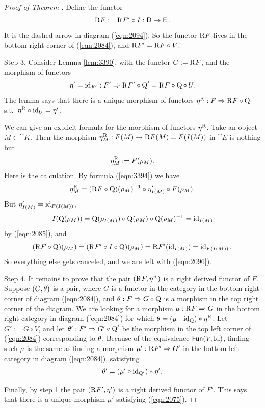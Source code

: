 \begin{proof}[Proof of Theorem \tup{\ref{thm:2080}}]
Define the functor 
\begin{equation} \label{eqn:2095}  
\mathrm{R} F := \mathrm{R} F' \circ I :  \operatorname{\mathsf{D}} \to \operatorname{\mathsf{E}} .
\end{equation}
It is the dashed arrow in diagram (\ref{eqn:2094}). 
So the functor $\mathrm{R} F$ lives in the bottom right corner of 
(\ref{eqn:2084}), and $\mathrm{R} F' = \mathrm{R} F \circ V$.

\medskip \noindent 
Step 3. Consider Lemma \ref{lem:3390}, with the functor 
$G := \mathrm{R} F$, and the morphism of functors
\[ \eta' = \operatorname{id}_{F'} : F' \Rightarrow \mathrm{R} F' \circ \operatorname{Q}' = 
\mathrm{R} F \circ \operatorname{Q} \circ \, U . \]
The lemma says that there is a unique morphism of functors 
$\eta^{\mathrm{R}} : F \Rightarrow \mathrm{R} F \circ \operatorname{Q}$
s.t.\ $\eta^{\mathrm{R}} \circ \operatorname{id}_U = \eta'$. 

We can give an explicit formula for the morphism of functors $\eta^{\mathrm{R}}$. 
Take an object $M \in \cat{K}$. Then the morphism 
$\eta^{\mathrm{R}}_M : F(M) \to \mathrm{R} F(M) = F(I(M))$
in $\cat{E}$ is nothing but 
\begin{equation} \label{eqn:2096} 
\eta^{\mathrm{R}}_M := F(\rho_M) . 
\end{equation}
Here is the calculation. By formula (\ref{eqn:3394}) we have
\[ \eta^{\mathrm{R}}_M = (\mathrm{R} F \circ \operatorname{Q})(\rho_M)^{-1} \circ \eta'_{I(M)} 
\circ F(\rho_M) . \]
But 
$\eta'_{I(M)} = \operatorname{id}_{F(I(M))}$, 
\[ I(\operatorname{Q}(\rho_M)) = \operatorname{Q}(\rho_{I(M)}) \circ \operatorname{Q}(\rho_M) \circ 
\operatorname{Q}(\rho_M)^{-1} = \operatorname{id}_{I(M)} \]
by (\ref{eqn:2085}), and 
\[ (\mathrm{R} F \circ \operatorname{Q})(\rho_M) = 
(\mathrm{R} F' \circ I \circ \operatorname{Q})(\rho_M) = 
\mathrm{R} F'(\operatorname{id}_{I(M)}) = \operatorname{id}_{F(I(M))} . \]
So everything else gets canceled, and we are left with (\ref{eqn:2096}). 

\medskip \noindent 
Step 4. It remains to prove that the pair $(\mathrm{R} F, \eta^{\mathrm{R}})$ is a 
right derived functor of $F$. Suppose $(G, \theta)$ is a pair, where $G$ is a 
functor in the category in the bottom right corner of diagram (\ref{eqn:2084}), 
and $\theta : F \Rightarrow G  \circ \operatorname{Q}$ 
is a morphism in the top right corner of the diagram.
We are looking for a morphism 
$\mu : \mathrm{R} F \Rightarrow G$
in the bottom right category in diagram (\ref{eqn:2084}) for which 
$\theta = (\mu \circ \operatorname{id}_{\operatorname{Q}}) * \eta^{\mathrm{R}}$. 
Let $G' := G \circ V$, and let $\theta' : F' \Rightarrow G' \circ \operatorname{Q}'$
be the morphism in the top left corner of (\ref{eqn:2084}) corresponding to 
$\theta$. Because of the equivalence $\operatorname{\mathsf{Fun}}(V, \operatorname{Id})$, finding such $\mu$ 
is the same as finding a morphism
$\mu' : \mathrm{R} F' \Rightarrow G'$
in the bottom left category in diagram (\ref{eqn:2084}), satisfying
\begin{equation} \label{eqn:2075}
\theta' = (\mu' \circ \operatorname{id}_{\operatorname{Q}'}) * \eta' .
\end{equation}

Finally, by step 1 the pair $(\mathrm{R} F', \eta')$ is a right derived functor 
of $F'$. This says that there is a unique morphism 
$\mu'$ satisfying (\ref{eqn:2075}). 
\end{proof}

